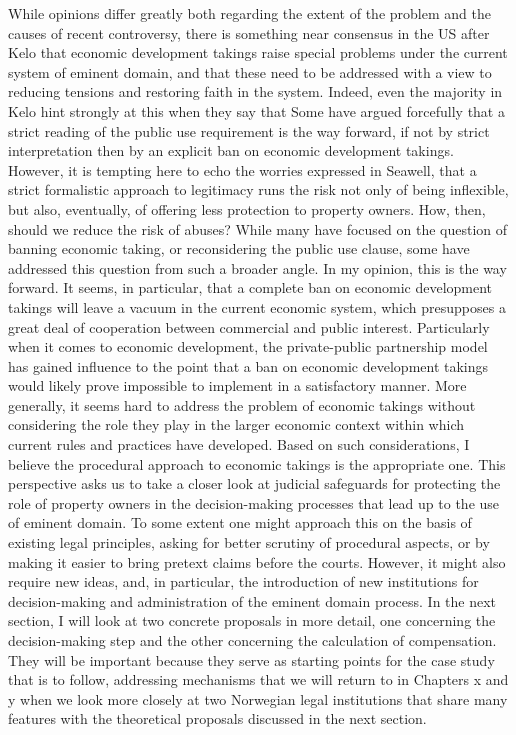 While opinions differ greatly both regarding the extent of the problem and the causes of recent controversy, there is something near consensus in the US after Kelo that economic development takings raise special problems under the current system of eminent domain, and that these need to be addressed with a view to reducing tensions and restoring faith in the system. Indeed, even the majority in Kelo hint strongly at this when they say that  
Some have argued forcefully that a strict reading of the public use requirement is the way forward, if not by strict interpretation then by an explicit ban on economic development takings.  However, it is tempting here to echo the worries expressed in Seawell, that a strict formalistic approach to legitimacy runs the risk not only of being inflexible, but also, eventually, of offering less  protection to property owners. How, then, should we reduce the risk of abuses?
While many have focused on the question of banning economic taking, or reconsidering the public use clause, some have addressed this question from such a broader angle. In my opinion, this is the way forward. It seems, in particular, that a complete ban on economic development takings will leave a vacuum in the current economic system, which presupposes a great deal of cooperation between commercial and public interest. Particularly when it comes to economic development, the private-public partnership model has gained influence to the point that a ban on economic development takings would likely prove impossible to implement in a satisfactory manner. 
More generally, it seems hard to address the problem of economic takings without considering the role they play in the larger economic context within which current rules and practices have developed. Based on such considerations, I believe the procedural approach to economic takings is the appropriate one. This perspective asks us to take a closer look at judicial safeguards for protecting the role of property owners in the decision-making processes that lead up to the use of eminent domain. To some extent one might approach this on the basis of existing legal principles, asking for better scrutiny of procedural aspects, or by making it easier to bring pretext claims before the courts. However, it might also require new ideas, and, in particular, the introduction of new institutions for decision-making and administration of the eminent domain process. In the next section, I will look at two concrete proposals in more detail, one concerning the decision-making step and the other concerning the calculation of compensation. 
They will be important because they serve as starting points for the case study that is to follow, addressing mechanisms that we will return to in Chapters x and y when we look more closely at two Norwegian legal institutions that share many features with the theoretical proposals discussed in the next section.

